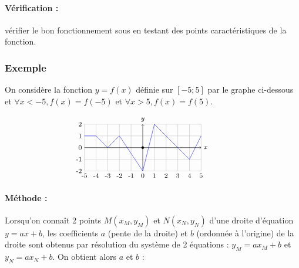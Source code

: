 \paragraph{Vérification :} vérifier le bon fonctionnement sous \python{} en testant des points
caractéristiques de la fonction.

\subsubsection{Exemple}
On considère la fonction $y = f(x)$ 
définie sur $[-5;5]$  par le graphe ci-dessous et $\forall x < -5, f(x) = f(-5)$
et $\forall x > 5, f(x) = f(5)$. 

$$\begin{minipage}{6.75cm}
\begin{tikzpicture}[scale=0.5]\footnotesize
\draw[color=lightgray](-5,-2) grid[xstep=1,ystep=1] (5,2);
\foreach \x in {-5,-4,...,5} \draw(\x,-2) node[below]{\x};
\foreach \y in {-2,-1,...,2} \draw(-5,\y) node[left]{\y};
\filldraw(0,0) circle (0.1);
\draw[->] (-5,0) -- (5,0);
\draw (5,0) node[right]{$x$} ;
\draw[->] (0,-2) -- (0,2);
\draw (0,2) node[above]{$y$};
\draw[color=blue] (-5,1) -- (-4,1) -- (-3,0) -- (-2,1) -- (0,-2) -- (1,2) -- (4,-1) -- (5,1);
\end{tikzpicture}
\end{minipage}
$$

\paragraph{Méthode :} 
Lorsqu'on connaît 2 points $M(x_M,y_M)$ et $N(x_N,y_N)$ 
d'une droite d'équation $y = ax + b$, les coefficients $a$ (pente de la droite) 
et $b$ (ordonnée à l'origine) de la droite sont obtenus
par résolution du système de 2 équations : $y_M =ax_M + b$ et $y_N = ax_N + b$. 
On obtient alors $a$ et $b$ :

